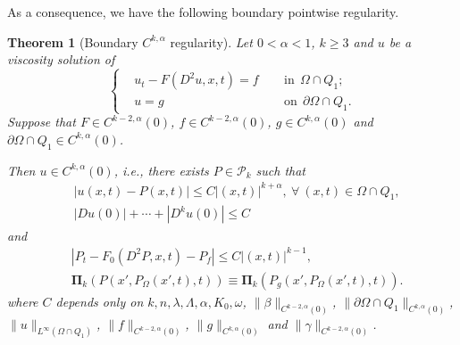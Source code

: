 \documentclass[preprint,12pt]{elsarticle}
\newtheorem{theorem}{Theorem}[section]
\theoremstyle{definition}
\theoremstyle{remark}
\numberwithin{equation}{section}
\begin{document}
As a consequence, we have the following boundary pointwise regularity.
\begin{theorem}[Boundary $C^{k,\alpha}$ regularity]\label{Cka}
Let $0<\alpha<1$, $k\geq 3$ and $u$ be a viscosity solution of
\begin{equation}\label{e.Cka.uF}
 \left\{ \begin{aligned}
&u_t-F(D^2u,x,t)=f ~~&&\mbox{in}~~\Omega\cap Q_1;\\
&u=g ~~&&\mbox{on}~~\partial \Omega\cap Q_1.
 \end{aligned}\right.
\end{equation}
Suppose that $F\in C^{k-2,\alpha}(0)$, $f\in C^{k-2,\alpha}(0)$, $g\in C^{k,\alpha}(0)$ and $\partial \Omega\cap Q_1\in C^{k,\alpha}(0)$.

Then $u\in C^{k,\alpha}(0)$, i.e., there exists $P\in \mathcal{P}_k$ such that
\begin{equation*}
  \begin{aligned}
&|u(x,t)-P(x,t)|\leq C |(x,t)|^{k+\alpha},~\forall ~(x,t)\in \Omega\cap Q_{1},\\
&|Du(0)|+\cdots+|D^{k}u(0)|\leq C
  \end{aligned}
\end{equation*}
and
\begin{equation*}
\begin{aligned}
&|P_t-F_0(D^2 P,x,t)-P_f|\leq C|(x,t)|^{k-1},\\
&\mathbf{\Pi}_{k}\left(P(x',P_{\Omega}(x',t),t)\right)\equiv
\mathbf{\Pi}_{k}\left(P_g(x',P_{\Omega}(x',t),t)\right).
\end{aligned}
\end{equation*}
where $C$ depends only on $k,n,\lambda,\Lambda,\alpha,K_0,\omega$, $\|\beta\|_{C^{k-2,\alpha}(0)}$, $\|\partial \Omega\cap Q_1\|_{C^{k,\alpha}(0)}$, $\|u\|_{L^{\infty}(\Omega\cap Q_1)}$, $\|f\|_{C^{k-2,\alpha}(0)}$, $\|g\|_{C^{k,\alpha}(0)}$ and $\|\gamma\|_{C^{k-2,\alpha}(0)}$.
\end{theorem}
\end{document}
